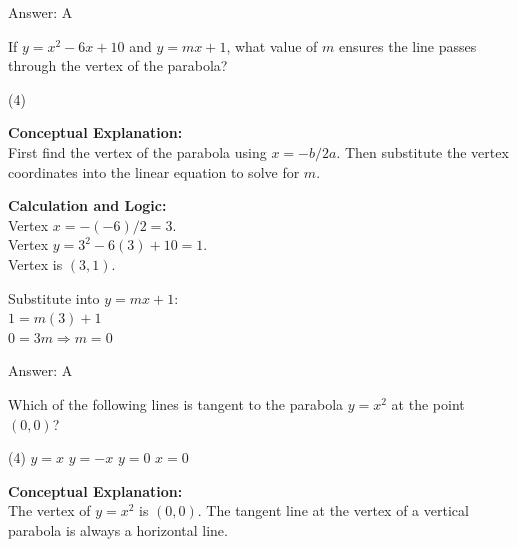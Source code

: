 \documentclass[11pt,paper=a4,answers]{exam}
\begin{document}
\begin{questions}
\begin{solution}
Answer: \colorbox{yellow!100}{A}
\end{solution}

\vspace{40pt}

\question
If $y = x^2 - 6x + 10$ and $y = mx + 1$, what value of $m$ ensures the line passes through the vertex of the parabola?
\begin{tasks}(4)
\end{tasks}

\begin{solution}
\textbf{Conceptual Explanation:} \\
First find the vertex of the parabola using $x = -b/2a$. Then substitute the vertex coordinates into the linear equation to solve for $m$.

\vspace{20pt}

\textbf{Calculation and Logic:} \\
Vertex $x = -(-6)/2 = 3$. \\
Vertex $y = 3^2 - 6(3) + 10 = 1$. \\
Vertex is $(3, 1)$.

\vspace{10pt}

Substitute into $y = mx + 1$: \\
$1 = m(3) + 1$ \\
$0 = 3m \Rightarrow m = 0$

\vspace{25pt}

Answer: \colorbox{yellow!100}{A}
\end{solution}

\vspace{40pt}

\question
Which of the following lines is tangent to the parabola $y = x^2$ at the point $(0, 0)$?
\begin{tasks}(4)
    \task $y = x$
    \task $y = -x$
    \task $y = 0$
    \task $x = 0$
\end{tasks}

\begin{solution}
\textbf{Conceptual Explanation:} \\
The vertex of $y = x^2$ is $(0, 0)$. The tangent line at the vertex of a vertical parabola is always a horizontal line.


\end{solution}
\end{questions}
\end{document}
